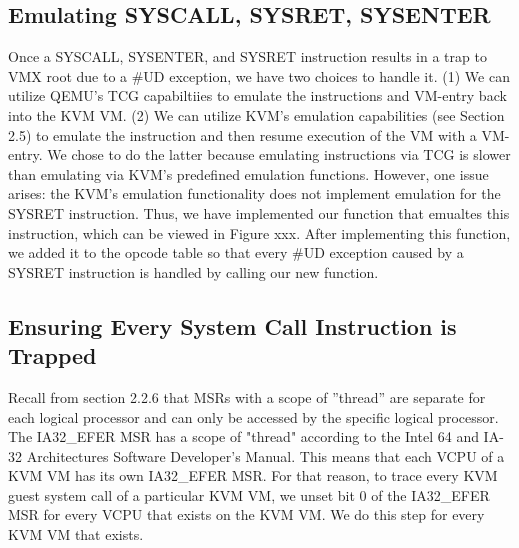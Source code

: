 \documentclass{report}
\begin{document}
\begin{spacing}{1.5}
\subsection{Emulating SYSCALL, SYSRET, SYSENTER}

{\large
Once a SYSCALL, SYSENTER, and SYSRET instruction results in a trap to VMX root due to a \#UD exception, we have two choices to handle it. (1) We can utilize QEMU's TCG capabiltiies to emulate the instructions and VM-entry back into the KVM VM. (2) We can utilize KVM's emulation capabilities (see Section 2.5) to emulate the instruction and then resume execution of the VM with a VM-entry. We chose to do the latter because emulating instructions via TCG is slower than emulating via KVM's predefined emulation functions. However, one issue arises: the KVM's emulation functionality does not implement emulation for the SYSRET instruction. Thus, we have implemented our function that emualtes this instruction, which can be viewed in Figure xxx. After implementing this function, we added it to the opcode table so that every \#UD exception caused by a SYSRET instruction is handled by calling our new function.
\newline
}


\subsection{Ensuring Every System Call Instruction is Trapped}
{\large
Recall from section 2.2.6 that MSRs with a scope of ”thread” are separate for each logical processor and can only be accessed by the specific logical processor. The IA32\_EFER MSR has a scope of "thread" according to the Intel 64 and IA-32 Architectures Software Developer’s Manual. This means that each VCPU of a KVM VM has its own IA32\_EFER MSR. For that reason, to trace every KVM guest system call of a particular KVM VM, we unset bit 0 of the IA32\_EFER MSR for every VCPU that exists on the KVM VM. We do this step for every KVM VM that exists. 
\leavevmode\newline
}


\end{spacing}
\end{document}
